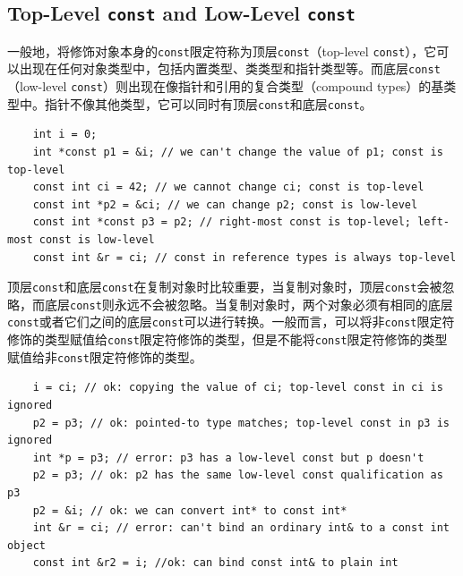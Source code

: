 \subsection{Top-Level \texttt{const} and Low-Level \texttt{const}}
一般地，将修饰对象本身的\texttt{const}限定符称为顶层\texttt{const}（top-level \texttt{const}），它可以出现在任何对象类型中，包括内置类型、类类型和指针类型等。而底层\texttt{const}（low-level \texttt{const}）则出现在像指针和引用的复合类型（compound types）的基类型中。指针不像其他类型，它可以同时有顶层\texttt{const}和底层\texttt{const}。

\begin{verbatim}
    int i = 0;
    int *const p1 = &i; // we can't change the value of p1; const is top-level
    const int ci = 42; // we cannot change ci; const is top-level
    const int *p2 = &ci; // we can change p2; const is low-level
    const int *const p3 = p2; // right-most const is top-level; left-most const is low-level
    const int &r = ci; // const in reference types is always top-level
\end{verbatim}

顶层\texttt{const}和底层\texttt{const}在复制对象时比较重要，当复制对象时，顶层\texttt{const}会被忽略，而底层\texttt{const}则永远不会被忽略。当复制对象时，两个对象必须有相同的底层\texttt{const}或者它们之间的底层\texttt{const}可以进行转换。一般而言，可以将非\texttt{const}限定符修饰的类型赋值给\texttt{const}限定符修饰的类型，但是不能将\texttt{const}限定符修饰的类型赋值给非\texttt{const}限定符修饰的类型。

\begin{verbatim}
    i = ci; // ok: copying the value of ci; top-level const in ci is ignored
    p2 = p3; // ok: pointed-to type matches; top-level const in p3 is ignored
    int *p = p3; // error: p3 has a low-level const but p doesn't
    p2 = p3; // ok: p2 has the same low-level const qualification as p3
    p2 = &i; // ok: we can convert int* to const int*
    int &r = ci; // error: can't bind an ordinary int& to a const int object
    const int &r2 = i; //ok: can bind const int& to plain int
\end{verbatim}

